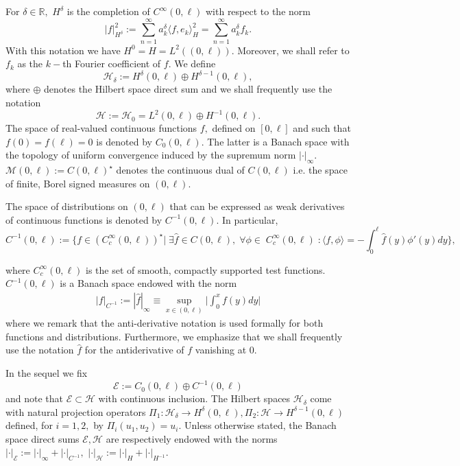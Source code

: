 \documentclass[10pt, reqno]{amsart}
\newcommand{\R}{\mathbb{R}}
\newcommand{\h}{\mathcal{H}}
\newcommand{\e}{\mathcal{E}}
\theoremstyle{definition}
\numberwithin{lem}{section}
\numberwithin{cor}{section}
\numberwithin{prop}{section}
\numberwithin{thm}{section}
\numberwithin{dfn}{section}
\begin{document}
For $\delta\in\R,$ $H^\delta$ is the completion of $C^\infty(0,\ell)$ with respect to the norm
$$|f|^2_{H^\delta}:=\sum_{n=1}^{\infty}a^\delta_k\langle f, e_k\rangle^2_H=\sum_{n=1}^{\infty}a^\delta_kf_k.$$ With this notation we have $H^0=H=L^2((0,\ell)).$ Moreover, we shall refer to $f_k$ as the $k-$th Fourier coefficient of $f.$
We define
	      $$\h_\delta:=H^{\delta}(0,\ell)\oplus H^{\delta-1}(0,\ell),$$
       where $\oplus$ denotes the Hilbert space direct sum and we shall frequently use the notation $$\h:=\mathcal{H}_0=L^2(0,\ell)\oplus H^{-1}(0,\ell).$$ The  space of real-valued continuous functions $f,$ defined on $[0,\ell]$ and such that $f(0)=f(\ell)=0$ is denoted by    $C_0(0,\ell).$ The latter is  a Banach space with the topology of uniform convergence induced by the supremum norm $|\cdot|_\infty$.  $\mathcal{M}(0,\ell):=C(0,\ell)^\star$ denotes the continuous dual of $C(0,\ell)$ i.e.  the space of finite, Borel signed measures on $(0,\ell).$
       
       
       
       The space of distributions on $(0,\ell)$ that can be expressed as weak derivatives of continuous functions is denoted by $C^{-1}(0,\ell).$ In particular,
        \begin{equation}\label{eq:C-1definition}
            C^{-1}(0,\ell):=\bigg\{ f\in (C^{\infty}_c(0,\ell))^\star\bigg|\; \exists \hat{f}\in C(0,\ell),\; \forall \phi\in\; C^{\infty}_c(0,\ell)\;:  \langle f,\phi\rangle=-\int_{0}^{\ell}\hat{f}(y)\phi'(y)dy
    	       \bigg\},
        \end{equation}
     
       where $C_c^\infty(0,\ell)$ is the set of smooth, compactly supported test functions.
            $C^{-1}(0,\ell)$ is a Banach space endowed with the norm 
\begin{equation*}\label{eq:Cminusnorm}
            \begin{aligned}  |f|_{C^{-1}}:=|\hat{f}|_{\infty}\equiv\sup_{x\in(0,\ell)}\bigg|\int_0^x f(y)dy\bigg| 
            \end{aligned}
        \end{equation*}
        where we remark that the anti-derivative notation is used formally for both functions and distributions. Furthermore, we emphasize that we shall frequently use the notation $\hat{f}$ for the antiderivative of $f$ vanishing at $0.$        
        
        
        In the sequel we fix
    	   \begin{equation}\label{eq:Espace}
     \e:=C_0(0,\ell)\oplus C^{-1}(0,\ell)
    	   \end{equation}
      and note that $\e\subset\h$ with continuous inclusion. The Hilbert spaces $\h_\delta$ come with natural projection operators $\Pi_1:\h_\delta \rightarrow H^{\delta}(0,\ell), \Pi_2: \h\rightarrow H^{\delta-1}(0,\ell)$ defined, for $i=1,2,$ by $ \Pi_i(u_1,u_2)=u_i.$ Unless otherwise stated, the Banach space direct sums  $\e,\h$ are respectively endowed with the norms $|\cdot|_{\e}:=|\cdot|_\infty+|\cdot|_{C^{-1}} ,$ $|\cdot|_{\h}:=|\cdot|_H+|\cdot|_{H^{-1}}.$
\end{document}

